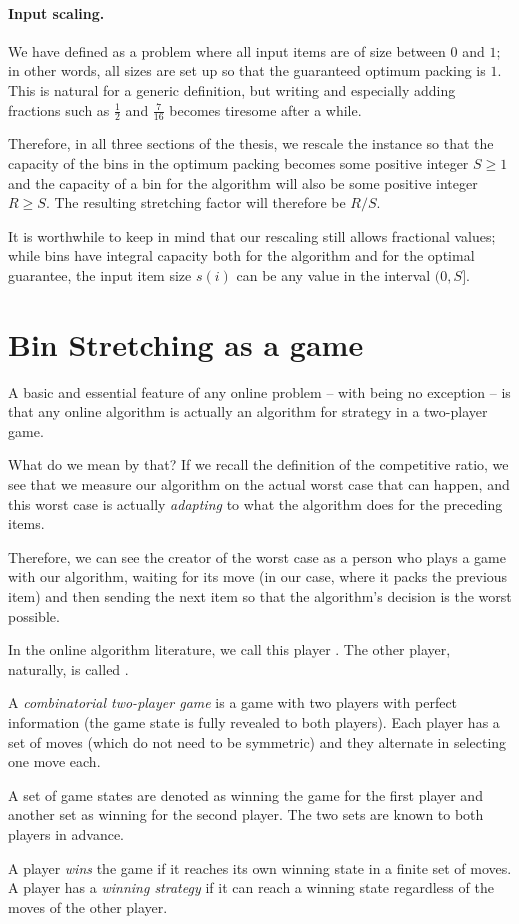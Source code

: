 \paragraph{Input scaling.} We have defined \binstretch as a problem
where all input items are of size between $0$ and $1$; in other words,
all sizes are set up so that the guaranteed optimum packing is $1$.
This is natural for a generic definition, but writing and especially
adding fractions such as $\frac{1}{2}$ and $\frac{7}{16}$ becomes
tiresome after a while.

Therefore, in all three sections of the thesis, we rescale the
instance so that the capacity of the bins in the optimum packing
becomes some positive integer $S \ge 1$ and the capacity of a bin for
the algorithm will also be some positive integer $R \ge S$. The
resulting stretching factor will therefore be $R/S$.

It is worthwhile to keep in mind that our rescaling still allows
fractional values; while bins have integral capacity both for the
algorithm and for the optimal guarantee, the input item size $s(i)$
can be any value in the interval $(0,S]$.

\section{Bin Stretching as a game}\label{sec:1:game}

A basic and essential feature of any online problem -- with
\binstretch being no exception -- is that any online algorithm is
actually an algorithm for strategy in a two-player game.

What do we mean by that? If we recall the definition of the
competitive ratio, we see that we measure our algorithm on the actual
worst case that can happen, and this worst case is actually
\emph{adapting} to what the algorithm does for the preceding items.

Therefore, we can see the creator of the worst case as a person who
plays a game with our algorithm, waiting for its move (in our case,
where it packs the previous item) and then sending the next item so
that the algorithm's decision is the worst possible.

In the online algorithm literature, we call this player
\adversary. The other player, naturally, is called \algo.

\begin{dfn} 
A \emph{combinatorial two-player game} is a game with two
players with perfect information (the game state is fully revealed to
both players). Each player has a set of moves (which do not need to
be symmetric) and they alternate in selecting one move each.

A set of game states are denoted as winning the game for the first
player and another set as winning for the second player. The two sets
are known to both players in advance.

A player \emph{wins} the game if it reaches its own winning state in a
finite set of moves. A player has a \emph{winning strategy} if
it can reach a winning state regardless of the moves of the other
player.
\end{dfn}

